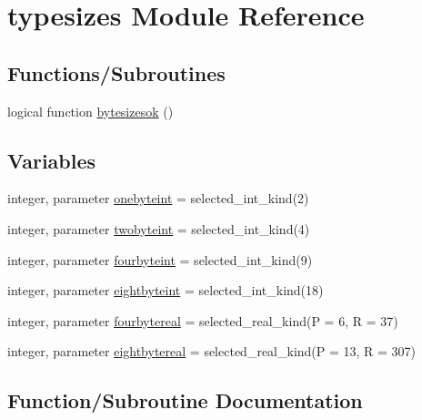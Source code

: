 \hypertarget{namespacetypesizes}{}\section{typesizes Module Reference}
\label{namespacetypesizes}
\subsection*{Functions/\+Subroutines}
\begin{DoxyCompactItemize}
\item 
logical function \hyperlink{namespacetypesizes_a146afb3c5f10f03943ceb3c28e91089e}{bytesizesok} ()
\end{DoxyCompactItemize}
\subsection*{Variables}
\begin{DoxyCompactItemize}
\item 
integer, parameter \hyperlink{namespacetypesizes_aa1f2e4f7a7d6f61a1c684ae370b4b2c4}{onebyteint} = selected\+\_\+int\+\_\+kind(2)
\item 
integer, parameter \hyperlink{namespacetypesizes_a69e9798b70a7f85aba877b95cd0dcf50}{twobyteint} = selected\+\_\+int\+\_\+kind(4)
\item 
integer, parameter \hyperlink{namespacetypesizes_ac1638da869cdc25b2ab9a90bea92ff44}{fourbyteint} = selected\+\_\+int\+\_\+kind(9)
\item 
integer, parameter \hyperlink{namespacetypesizes_a10dcbb5b8bcff788b35e312be2b1f49a}{eightbyteint} = selected\+\_\+int\+\_\+kind(18)
\item 
integer, parameter \hyperlink{namespacetypesizes_a63d61f1f3d8b3fa297b620f0e3c0b92e}{fourbytereal} = selected\+\_\+real\+\_\+kind(P = 6, R = 37)
\item 
integer, parameter \hyperlink{namespacetypesizes_a7e57bc93c84af9c608fcea1661caa070}{eightbytereal} = selected\+\_\+real\+\_\+kind(P = 13, R = 307)
\end{DoxyCompactItemize}


\subsection{Function/\+Subroutine Documentation}
\mbox{\label{namespacetypesizes_a146afb3c5f10f03943ceb3c28e91089e}} 
